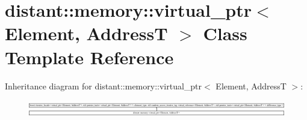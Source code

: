 \hypertarget{classdistant_1_1memory_1_1virtual__ptr}{}\section{distant\+:\+:memory\+:\+:virtual\+\_\+ptr$<$ Element, AddressT $>$ Class Template Reference}
\label{classdistant_1_1memory_1_1virtual__ptr}
Inheritance diagram for distant\+:\+:memory\+:\+:virtual\+\_\+ptr$<$ Element, AddressT $>$\+:\begin{figure}[H]
\begin{center}
\leavevmode
\includegraphics[height=0.704403cm]{classdistant_1_1memory_1_1virtual__ptr}
\end{center}
\end{figure}
